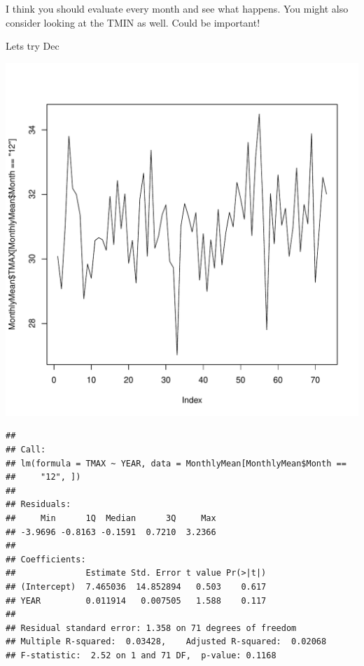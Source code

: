 \documentclass{article}\usepackage[]{graphicx}\usepackage[]{color}
\makeatletter
\def\maxwidth{ %
  \ifdim\Gin@nat@width>\linewidth
    \linewidth
  \else
    \Gin@nat@width
  \fi
}
\newenvironment{kframe}{%
 \def\at@end@of@kframe{}%
 \ifinner\ifhmode%
  \def\at@end@of@kframe{\end{minipage}}%
  \begin{minipage}{\columnwidth}%
 \fi\fi%
 \def\FrameCommand##1{\hskip\@totalleftmargin \hskip-\fboxsep
 \colorbox{shadecolor}{##1}\hskip-\fboxsep
     \hskip-\linewidth \hskip-\@totalleftmargin \hskip\columnwidth}%
 \MakeFramed {\advance\hsize-\width
   \@totalleftmargin\z@ \linewidth\hsize
   \@setminipage}}%
 {\par\unskip\endMakeFramed%
 \at@end@of@kframe}
\newenvironment{knitrout}{}{} %
\makeatother
\begin{document}
I think you should evaluate every month and see what happens. You might also consider looking at the TMIN as well. Could be important!

Lets try Dec

\begin{knitrout}
\color{fgcolor}
\includegraphics[width=\maxwidth]{figure/unnamed-chunk-22-1} 
\begin{kframe}\begin{verbatim}
## 
## Call:
## lm(formula = TMAX ~ YEAR, data = MonthlyMean[MonthlyMean$Month == 
##     "12", ])
## 
## Residuals:
##     Min      1Q  Median      3Q     Max 
## -3.9696 -0.8163 -0.1591  0.7210  3.2366 
## 
## Coefficients:
##              Estimate Std. Error t value Pr(>|t|)
## (Intercept)  7.465036  14.852894   0.503    0.617
## YEAR         0.011914   0.007505   1.588    0.117
## 
## Residual standard error: 1.358 on 71 degrees of freedom
## Multiple R-squared:  0.03428,	Adjusted R-squared:  0.02068 
## F-statistic:  2.52 on 1 and 71 DF,  p-value: 0.1168
\end{verbatim}
\end{kframe}

\end{knitrout}
\end{document}
